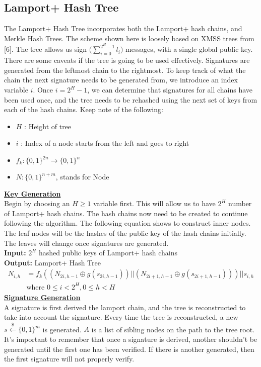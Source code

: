 \documentclass[]{scrartcl}
\begin{document}
\subsection*{Lamport+ Hash Tree}
The Lamport+ Hash Tree incorporates both the Lamport+ hash chains, and Merkle Hash Trees. The scheme shown here is loosely based on XMSS trees from [6]. The tree allows us sign $\Big(\sum_{i=0}^{2^H-1} l_i\Big)$ messages, with a single global public key. There are some caveats if the tree is going to be used effectively. Signatures are generated from the leftmost chain to the rightmost. To keep track of what the chain the next signature needs to be generated from, we introduce an index variable $i$. Once $i = 2^H-1$, we can determine that signatures for all chains have been used once, and the tree needs to be rehashed using the next set of keys from each of the hash chains. Keep note of the following:
\begin{itemize}
	\item $H$ : Height of tree
	\item $i$ : Index of a node starts from the left and goes to right
	\item $f_k : \{0,1\}^{2n} \rightarrow \{0,1\}^n$
	\item $N : \{0,1\}^{n+m}$, stands for Node
\end{itemize}
\textbf{\underline{Key Generation}}\\
Begin by choosing an $H \geq 1$ variable first. This will allow us to have $2^H$ number of Lamport+ hash chains. The hash chains now need to be created to continue following the algorithm. The following equation shows to construct inner nodes. The leaf nodes will be the hashes of the public key of the hash chains initially. The leaves will change once signatures are generated.\\
\textbf{Input:} $2^H$ hashed public keys of Lamport+ hash chains\\
\textbf{Output:} Lamport+ Hash Tree
\begin{equation}
\begin{split}
N_{i,h} & = f_k((N_{2i,h-1} \oplus g(s_{2i,h-1}))||(N_{2i+1,h-1} \oplus g(s_{2i+1,h-1}))) || s_{i,h} \\
& \textrm{where }0\leq i <2^H, 0 \leq h < H
\end{split}
\end{equation}
\textbf{\underline{Signature Generation}}\\
A signature is first derived the lamport chain, and the tree is reconstructed to take into account the signature. Every time the tree is reconstructed, a new $s \xleftarrow{\$} \{0,1\}^m$ is generated. $A$ is a list of sibling nodes on the path to the tree root. It's important to remember that once a signature is derived, another shouldn't be generated until the first one has been verified. If there is another generated, then the first signature will not properly verify.\\
\end{document}
